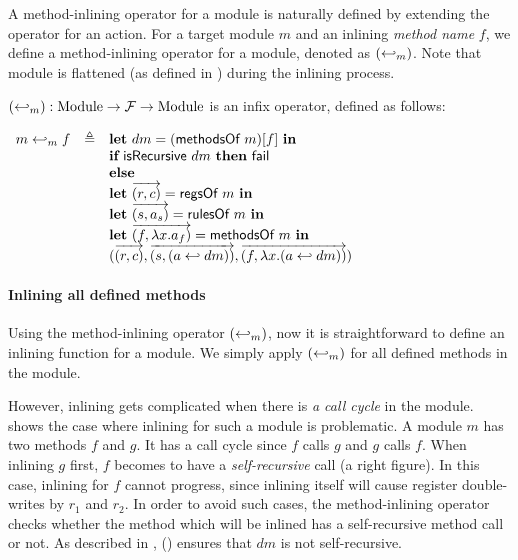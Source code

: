 A method-inlining operator for a module is naturally defined by
extending the operator for an action. For a target module $m$ and an
inlining \emph{method name} $f$, we define a method-inlining operator
for a module, denoted as $(\hookleftarrow_{m})$. Note that module is
flattened (as defined in ) during the inlining
process.

\begin{definition}
  \label{def-inlinedmm}
  $(\hookleftarrow_{m}) : \textrm{Module} \to \mathcal{F}{} \to
  \textrm{Module}$ is an infix operator, defined as follows:
  \begin{center}
    \begin{math}
      \begin{array}{rcl}
        \inlinedmm{m}{f} & \triangleq & \pgmlet{} dm = (\methsofm{m})[f]\ \pgmin{} \\
        & & \pgmif{} \isrec{dm}\ \pgmthen{} \fail{} \\
        & & \pgmelse{} \\
        & & \pgmlet{} \listof{\regpair{r}{c}} = \regsofm{m}\ \pgmin{} \\
        & & \pgmlet{} \listof{\rulepair{s}{a_s}} = \rulesofm{m}\ \pgmin{} \\
        & & \pgmlet{} \listof{\methodpair{f}{\lambda x.a_f}} = \methsofm{m}\ \pgmin{} \\
        & & \modbasic{\regpair{r}{c}}
                  {\rulepair{s}{(\inlinedm{a}{dm})}}
                  {\methodpair{f}{\lambda x.(\inlinedm{a}{dm})}} \\
      \end{array}
    \end{math}
  \end{center}
\end{definition}

\paragraph{Inlining all defined methods}

Using the method-inlining operator $(\hookleftarrow_{m})$, now it is
straightforward to define an inlining function for a module. We simply
apply $(\hookleftarrow_{m})$ for all defined methods in the module.

However, inlining gets complicated when there is \emph{a call cycle}
in the module.  shows the case where
inlining for such a module is problematic. A module $m$ has two
methods $f$ and $g$. It has a call cycle since $f$ calls $g$ and $g$
calls $f$. When inlining $g$ first, $f$ becomes to have a
\emph{self-recursive} call (a right figure). In this case, inlining
for $f$ cannot progress, since inlining itself will cause register
double-writes by $r_1$ and $r_2$. In order to avoid such cases, the
method-inlining operator checks whether the method which will be
inlined has a self-recursive method call or not. As described in
, () ensures that $dm$ is not
self-recursive.

